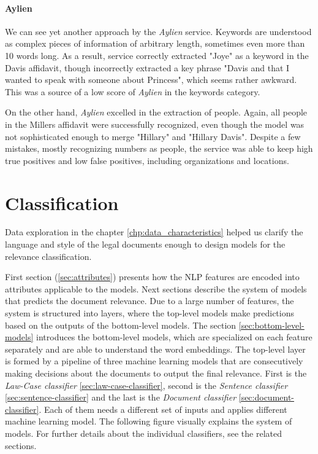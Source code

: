\documentclass[
  digital, %
  table,   %
  lof,     %
  lot,     %
]{fithesis3}
\begin{document}
\subsubsection{\textbf{Aylien}}
We can see yet another approach by the \textit{Aylien} service.
Keywords are understood as complex pieces of information of arbitrary length, sometimes even more than 10 words long.
As a result, service correctly extracted "Joye" as a keyword in the Davis affidavit, though incorrectly extracted a key phrase "Davis and that I wanted to speak with someone about Princess", which seems rather awkward.
This was a source of a low score of \textit{Aylien} in the keywords category.

On the other hand, \textit{Aylien} excelled in the extraction of people.
Again, all people in the Millers affidavit were successfully recognized, even though the model was not sophisticated enough to merge "Hillary" and "Hillary Davis".
Despite a few mistakes, mostly recognizing numbers as people, the service was able to keep high true positives and low false positives, including organizations and locations.


\chapter{Classification}
Data exploration in the chapter \ref{chp:data_characteristics} helped us clarify the language and style of the legal documents enough to design models for the relevance classification.

First section (\ref{sec:attributes}) presents how the NLP features are encoded into attributes applicable to the models.
Next sections describe the system of models that predicts the document relevance.
Due to a large number of features, the system is structured into layers, where the top-level models make predictions based on the outputs of the bottom-level models.
The section \ref{sec:bottom-level-models} introduces the bottom-level models, which are specialized on each feature separately and are able to understand the word embeddings.
The top-level layer is formed by a pipeline of three machine learning models that are consecutively making decisions about the documents to output the final relevance.
First is the \textit{Law-Case classifier} \ref{sec:law-case-classifier}, second is the \textit{Sentence classifier} \ref{sec:sentence-classifier} and the last is the \textit{Document classifier} \ref{sec:document-classifier}.
Each of them needs a different set of inputs and applies different machine learning model.
The following figure visually explains the system of models.
For further details about the individual classifiers, see the related sections.
\end{document}
